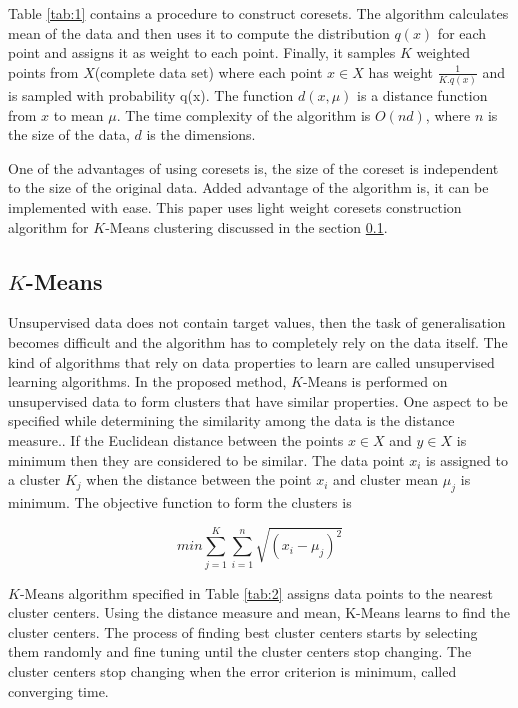 \documentclass[runningheads]{llncs}
\begin{document}
Table \ref{tab:1} contains a procedure\cite{Ashok Suthar} to construct coresets. The algorithm calculates mean of the data and then uses it to compute the distribution $q(x)$ for each point and assigns it as weight to each point. Finally, it samples $K$ weighted points from $X$(complete data set) where each point $x \in X$ has weight $\frac{1}{K.q(x)}$ and is sampled with probability q(x). The function $d(x,\mu)$ is a distance function from $x$ to mean $\mu$. The time complexity of the algorithm is $O(nd)$, where $n$ is the size of the data, $d$ is the dimensions. 

One of the advantages of using coresets is, the size of the coreset is independent to the size of the original data. Added advantage of the algorithm is, it can be implemented with ease. This paper uses light weight coresets construction algorithm for $K$-Means clustering discussed in the section \ref{subsec:2}.

\subsection{$K$-Means}
\label{subsec:2}
Unsupervised data does not contain target values, then the task of generalisation becomes difficult and the algorithm has to completely rely on the data itself. The kind of algorithms that rely on data properties to learn are called unsupervised learning algorithms. In the proposed method, $K$-Means\cite{Olivier Bachem} is performed on unsupervised data to form clusters that have similar properties. One aspect to be specified while determining the similarity among the data is the distance measure.. If the Euclidean distance between the points $x \in X$ and $y \in X$ is minimum then they are considered to be similar. The data point $x_i$ is assigned to a cluster $K_j$ when the distance between the point $x_i$ and cluster mean $\mu_j$ is minimum. The objective function to form the clusters is

\[ min \sum_{j=1}^{K} \sum_{i=1}^{n} \sqrt{(x_i - \mu_j)^2} \]

$K$-Means algorithm specified in Table \ref{tab:2} assigns data points to the nearest cluster centers. Using the distance measure and mean, K-Means learns to find the cluster centers. The process of finding best cluster centers starts by selecting them randomly and fine tuning until the cluster centers stop changing. The cluster centers stop changing when the error criterion is minimum, called converging time.
\end{document}
